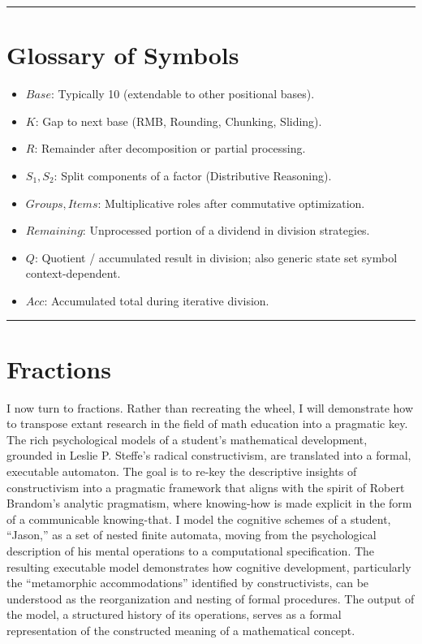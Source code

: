 \documentclass[12pt]{book}
\begin{document}
\begin{center}\rule{0.5\linewidth}{0.5pt}\end{center}

\section{Glossary of Symbols}\label{glossary-of-symbols}

\begin{itemize}
 
\item
  \(Base\): Typically 10 (extendable to other positional bases).
\item
  \(K\): Gap to next base (RMB, Rounding, Chunking, Sliding).
\item
  \(R\): Remainder after decomposition or partial processing.
\item
  \(S_1, S_2\): Split components of a factor (Distributive Reasoning).
\item
  \(Groups, Items\): Multiplicative roles after commutative
  optimization.
\item
  \(Remaining\): Unprocessed portion of a dividend in division
  strategies.
\item
  \(Q\): Quotient / accumulated result in division; also generic state
  set symbol context-dependent.
\item
  \(Acc\): Accumulated total during iterative division.
\end{itemize}

\begin{center}\rule{0.5\linewidth}{0.5pt}\end{center}

\section{Fractions}

I now turn to fractions. Rather than recreating the wheel, I will demonstrate how to transpose extant research in the field of math education into a pragmatic key. The rich psychological models of a student's mathematical development, grounded in Leslie P. Steffe's radical constructivism, are translated into a formal, executable automaton. The goal is to re-key the descriptive insights of constructivism into a pragmatic framework that aligns with the spirit of Robert Brandom's analytic pragmatism, where knowing-how is made explicit in the form of a communicable knowing-that. I model the cognitive schemes of a student, ``Jason,'' as a set of nested finite automata, moving from the psychological description of his mental operations to a computational specification. The resulting executable model demonstrates how cognitive development, particularly the ``metamorphic accommodations'' identified by constructivists, can be understood as the reorganization and nesting of formal procedures. The output of the model, a structured history of its operations, serves as a formal representation of the constructed meaning of a mathematical concept.
\end{document}
